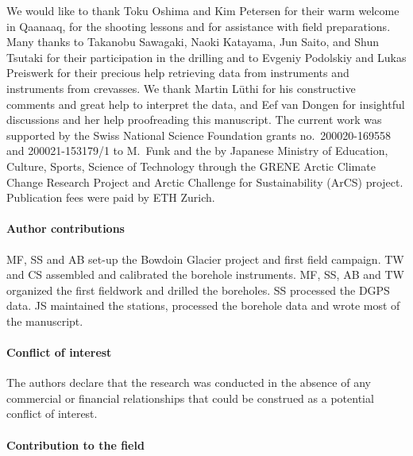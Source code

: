 \documentclass[utf8]{article}
\begin{document}
    We would like to thank Toku Oshima and Kim Petersen for their warm welcome
    in Qaanaaq, for the shooting lessons and for assistance with field
    preparations. Many thanks to Takanobu Sawagaki, Naoki Katayama, Jun Saito,
    and Shun Tsutaki for their participation in the drilling and
    to Evgeniy Podolskiy and Lukas Preiswerk for
    their precious help retrieving data from instruments and instruments from
    crevasses. We thank Martin Lüthi for his constructive comments and great
    help to interpret the data, and Eef van Dongen for insightful discussions
    and her help proofreading this manuscript.
    The current work was supported by the Swiss National Science Foundation
    grants no.~200020-169558 and 200021-153179/1 to M.~Funk and the by Japanese
    Ministry of Education, Culture, Sports, Science of Technology through
    the GRENE Arctic Climate Change Research Project and Arctic Challenge for
    Sustainability (ArCS) project. Publication fees were paid by ETH Zurich.

\paragraph{Author contributions}

    MF, SS and AB set-up the Bowdoin Glacier project and first field campaign.
    TW and CS assembled and calibrated the borehole instruments. MF, SS, AB and
    TW organized the first fieldwork and drilled the boreholes. SS processed
    the DGPS data. JS maintained the stations, processed the borehole data and
    wrote most of the manuscript.

\paragraph{Conflict of interest}

    The authors declare that the research was conducted in the absence of any
    commercial or financial relationships that could be construed as a
    potential conflict of interest.

\paragraph{Contribution to the field}
\end{document}
